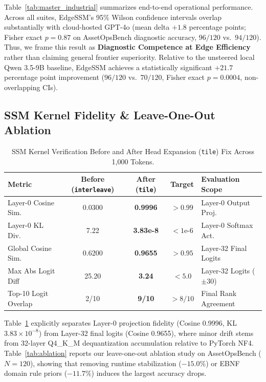 \documentclass[journal]{IEEEtran}
\begin{document}
Table~\ref{tab:master_industrial} summarizes end-to-end operational performance. Across all suites, EdgeSSM's 95\% Wilson confidence intervals overlap substantially with cloud-hosted GPT-4o (mean delta $+1.8$ percentage points; Fisher exact $p = 0.87$ on AssetOpsBench diagnostic accuracy, $96/120$ vs.\ $94/120$). Thus, we frame this result as \textbf{Diagnostic Competence at Edge Efficiency} rather than claiming general frontier superiority. Relative to the unsteered local Qwen 3.5-9B baseline, EdgeSSM achieves a statistically significant $+21.7$ percentage point improvement ($96/120$ vs.\ $70/120$, Fisher exact $p = 0.0004$, non-overlapping CIs).

\subsection{SSM Kernel Fidelity \& Leave-One-Out Ablation}

\begin{table}[htbp]
\centering
\caption{SSM Kernel Verification Before and After Head Expansion (\texttt{tile}) Fix Across 1,000 Tokens.}
\label{tab:kernel}
\footnotesize
\begin{tabular}{@{}lcccl@{}}
\toprule
\textbf{Metric} & \textbf{Before (\texttt{interleave})} & \textbf{After (\texttt{tile})} & \textbf{Target} & \textbf{Evaluation Scope} \\
\midrule
Layer-0 Cosine Sim. & 0.0300 & \textbf{0.9996} & $>0.99$ & Layer-0 Output Proj. \\
Layer-0 KL Div. & 7.22 & \textbf{3.83e-8} & $<1\text{e-}6$ & Layer-0 Softmax Act. \\
Global Cosine Sim. & 0.6200 & \textbf{0.9655} & $>0.95$ & Layer-32 Final Logits \\
Max Abs Logit Diff & 25.20 & \textbf{3.24} & $<5.0$ & Layer-32 Logits ($\pm 30$) \\
Top-10 Logit Overlap & 2/10 & \textbf{9/10} & $>8/10$ & Final Rank Agreement \\
\bottomrule
\end{tabular}
\end{table}

Table~\ref{tab:kernel} explicitly separates Layer-0 projection fidelity (Cosine 0.9996, KL $3.83 \times 10^{-8}$) from Layer-32 final logits (Cosine 0.9655), where minor drift stems from 32-layer Q4\_K\_M dequantization accumulation relative to PyTorch NF4. Table~\ref{tab:ablation} reports our leave-one-out ablation study on AssetOpsBench ($N=120$), showing that removing runtime stabilization ($-15.0\%$) or EBNF domain rule priors ($-11.7\%$) induces the largest accuracy drops.
\end{document}
